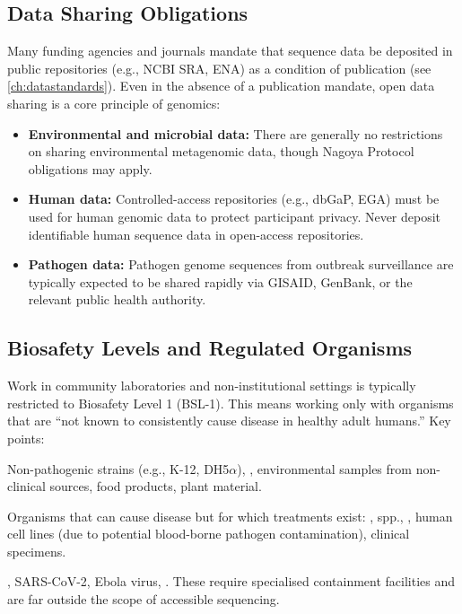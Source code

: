 \subsection{Data Sharing Obligations}
\label{subsec:accessible:datasharing}

Many funding agencies and journals mandate that sequence data be deposited in public repositories (e.g., NCBI SRA, ENA) as a condition of publication (see \cref{ch:datastandards}). Even in the absence of a publication mandate, open data sharing is a core principle of genomics:

\begin{itemize}[itemsep=2pt]
  \item \textbf{Environmental and microbial data:} There are generally no restrictions on sharing environmental metagenomic data, though Nagoya Protocol obligations may apply.
  \item \textbf{Human data:} Controlled-access repositories (e.g., dbGaP, EGA) must be used for human genomic data to protect participant privacy. Never deposit identifiable human sequence data in open-access repositories.
  \item \textbf{Pathogen data:} Pathogen genome sequences from outbreak surveillance are typically expected to be shared rapidly via GISAID, GenBank, or the relevant public health authority.
\end{itemize}

\subsection{Biosafety Levels and Regulated Organisms}
\label{subsec:accessible:biosafety}

Work in community laboratories and non-institutional settings is typically restricted to Biosafety Level 1 (BSL-1). This means working only with organisms that are ``not known to consistently cause disease in healthy adult humans.'' Key points:

\begin{description}[style=nextline, font=\bfseries, itemsep=4pt]
  \item[BSL-1 organisms (permitted)]
  Non-pathogenic  strains (e.g., K-12, DH5$\alpha$), , environmental samples from non-clinical sources, food products, plant material.

  \item[BSL-2 organisms (NOT permitted in community labs)]
  Organisms that can cause disease but for which treatments exist: ,  spp., , human cell lines (due to potential blood-borne pathogen contamination), clinical specimens.

  \item[BSL-3 and BSL-4 organisms (specialised facilities only)]
  , SARS-CoV-2, Ebola virus, . These require specialised containment facilities and are far outside the scope of accessible sequencing.
\end{description}

